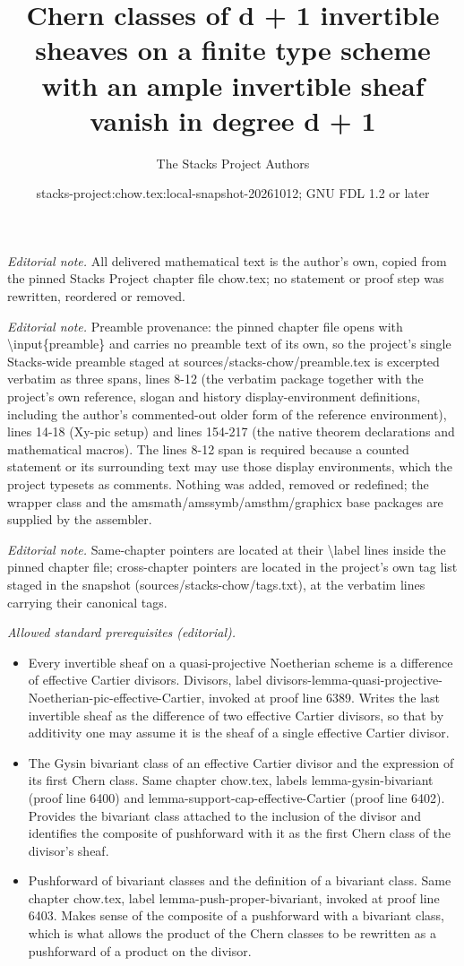 \documentclass[10pt,a4paper]{amsart}
\title{Chern classes of d + 1 invertible sheaves on a finite type scheme with an ample invertible sheaf vanish in degree d + 1}
\author{The Stacks Project Authors}
\date{stacks-project:chow.tex:local-snapshot-20261012; GNU FDL 1.2 or later}
\theoremstyle{plain}
\theoremstyle{definition}
\theoremstyle{remark}
\numberwithin{equation}{subsection}
\begin{document}
\maketitle
\noindent\textit{Editorial note.} All delivered mathematical text is the author's own, copied from the pinned Stacks Project chapter file chow.tex; no statement or proof step was rewritten, reordered or removed.\par\medskip
\noindent\textit{Editorial note.} Preamble provenance: the pinned chapter file opens with \textbackslash{}input\{preamble\} and carries no preamble text of its own, so the project's single Stacks-wide preamble staged at sources/stacks-chow/preamble.tex is excerpted verbatim as three spans, lines 8-12 (the verbatim package together with the project's own reference, slogan and history display-environment definitions, including the author's commented-out older form of the reference environment), lines 14-18 (Xy-pic setup) and lines 154-217 (the native theorem declarations and mathematical macros). The lines 8-12 span is required because a counted statement or its surrounding text may use those display environments, which the project typesets as comments. Nothing was added, removed or redefined; the wrapper class and the amsmath/amssymb/amsthm/graphicx base packages are supplied by the assembler.\par\medskip
\noindent\textit{Editorial note.} Same-chapter pointers are located at their \textbackslash{}label lines inside the pinned chapter file; cross-chapter pointers are located in the project's own tag list staged in the snapshot (sources/stacks-chow/tags.txt), at the verbatim lines carrying their canonical tags.\par\medskip
\noindent\textit{Allowed standard prerequisites (editorial).}\begin{itemize}
\item Every invertible sheaf on a quasi-projective Noetherian scheme is a difference of effective Cartier divisors. Divisors, label divisors-lemma-quasi-projective-Noetherian-pic-effective-Cartier, invoked at proof line 6389. Writes the last invertible sheaf as the difference of two effective Cartier divisors, so that by additivity one may assume it is the sheaf of a single effective Cartier divisor.
\item The Gysin bivariant class of an effective Cartier divisor and the expression of its first Chern class. Same chapter chow.tex, labels lemma-gysin-bivariant (proof line 6400) and lemma-support-cap-effective-Cartier (proof line 6402). Provides the bivariant class attached to the inclusion of the divisor and identifies the composite of pushforward with it as the first Chern class of the divisor's sheaf.
\item Pushforward of bivariant classes and the definition of a bivariant class. Same chapter chow.tex, label lemma-push-proper-bivariant, invoked at proof line 6403. Makes sense of the composite of a pushforward with a bivariant class, which is what allows the product of the Chern classes to be rewritten as a pushforward of a product on the divisor.
\end{itemize}\medskip
\end{document}
